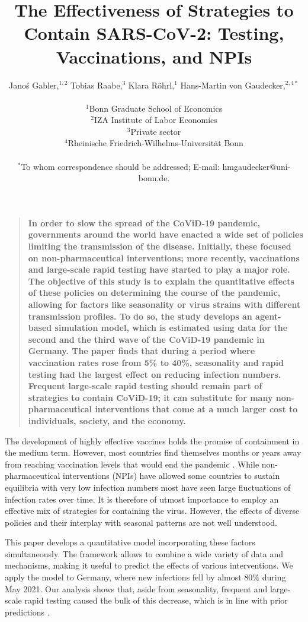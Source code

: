 \documentclass[12pt]{article}
\title{The Effectiveness of Strategies to Contain SARS-CoV-2: Testing, Vaccinations, and NPIs}
\author
{Janoś Gabler,$^{1, 2}$ Tobias Raabe,$^{3}$ Klara Röhrl,$^{1}$ Hans-Martin von Gaudecker,$^{2,4\ast}$\\
\\
\normalsize{$^{1}$Bonn Graduate School of Economics}\\
\normalsize{$^{2}$IZA Institute of Labor Economics}\\
\normalsize{$^{3}$Private sector}\\
\normalsize{$^{4}$Rheinische Friedrich-Wilhelms-Universität Bonn}\\
\\
\normalsize{$^\ast$To whom correspondence should be addressed; E-mail:  hmgaudecker@uni-bonn.de.}
}
\date{}
\newenvironment{sciabstract}{%
\begin{quote} \bf}
{\end{quote}}
\begin{document}

\baselineskip24pt


\maketitle




\begin{sciabstract}
    In order to slow the spread of the CoViD-19 pandemic, governments around the world
    have enacted a wide set of policies limiting the transmission of the disease.
    Initially, these focused on non-pharmaceutical interventions; more recently,
    vaccinations and large-scale rapid testing have started to play a major role. The
    objective of this study is to explain the quantitative effects of these policies on
    determining the course of the pandemic, allowing for factors like seasonality or
    virus strains with different transmission profiles. To do so, the study develops an
    agent-based simulation model, which is estimated using data for the second and the
    third wave of the CoViD-19 pandemic in Germany. The paper finds that during a period
    where vaccination rates rose from 5\% to 40\%, seasonality and rapid testing had the
    largest effect on reducing infection numbers. Frequent large-scale rapid testing
    should remain part of strategies to contain CoViD-19; it can substitute for many
    non-pharmaceutical interventions that come at a much larger cost to individuals,
    society, and the economy.
\end{sciabstract}

The development of highly effective vaccines holds the promise of containment in the
medium term. However, most countries find themselves months or years away from reaching
vaccination levels that would end the pandemic \cite{Mathieu2021}. While
non-pharmaceutical interventions (NPIs) have allowed some countries to sustain
equilibria with very low infection numbers \cite{Contreras2021} most have seen large
fluctuations of infection rates over time. It is therefore of utmost importance to
employ an effective mix of strategies for containing the virus. However, the effects of
diverse policies and their interplay with seasonal patterns are not well understood.

This paper develops a quantitative model incorporating these factors simultaneously. The
framework allows to combine a wide variety of data and mechanisms, making it useful to
predict the effects of various interventions. We apply the model to Germany, where new
infections fell by almost 80\% during May 2021. Our analysis shows that, aside from
seasonality, frequent and large-scale rapid testing caused the bulk of this decrease,
which is in line with prior predictions \cite{Mina2021}.
\end{document}
